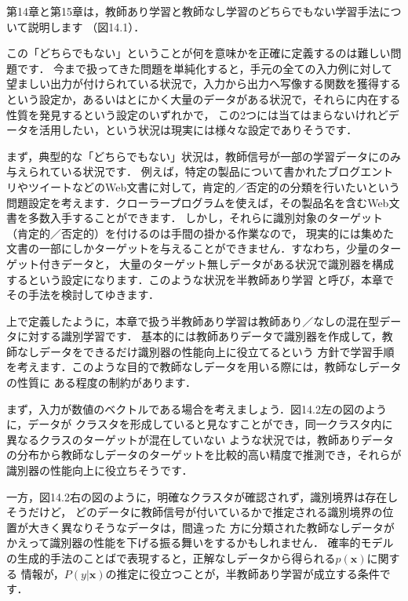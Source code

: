 

第14章と第15章は，教師あり学習と教師なし学習のどちらでもない学習手法について説明します
（図14.1）．


この「どちらでもない」ということが何を意味かを正確に定義するのは難しい問題です．
今まで扱ってきた問題を単純化すると，手元の全ての入力例に対して望ましい出力が付けられている状況で，入力から出力へ写像する関数を獲得するという設定か，あるいはとにかく大量のデータがある状況で，それらに内在する性質を発見するという設定のいずれかで，
この2つには当てはまらないけれどデータを活用したい，という状況は現実には様々な設定でありそうです．

まず，典型的な「どちらでもない」状況は，教師信号が一部の学習データにのみ与えられている状況です．
例えば，特定の製品について書かれたブログエントリやツイートなどのWeb文書に対して，肯定的／否定的の分類を行いたいという
問題設定を考えます．クローラープログラムを使えば，その製品名を含むWeb文書を多数入手することができます．
しかし，それらに識別対象のターゲット（肯定的／否定的）を付けるのは手間の掛かる作業なので，
現実的には集めた文書の一部にしかターゲットを与えることができません．すなわち，少量のターゲット付きデータと，
大量のターゲット無しデータがある状況で識別器を構成するという設定になります．このような状況を半教師あり学習
と呼び，本章でその手法を検討してゆきます．



上で定義したように，本章で扱う半教師あり学習は教師あり／なしの混在型データに対する識別学習です．
基本的には教師ありデータで識別器を作成して，教師なしデータをできるだけ識別器の性能向上に役立てるという
方針で学習手順を考えます．このような目的で教師なしデータを用いる際には，教師なしデータの性質に
ある程度の制約があります．



まず，入力が数値のベクトルである場合を考えましょう．図14.2左の図のように，データが
クラスタを形成していると見なすことができ，同一クラスタ内に異なるクラスのターゲットが混在していない
ような状況では，教師ありデータの分布から教師なしデータのターゲットを比較的高い精度で推測でき，それらが
識別器の性能向上に役立ちそうです．


一方，図14.2右の図のように，明確なクラスタが確認されず，識別境界は存在しそうだけど，
どのデータに教師信号が付いているかで推定される識別境界の位置が大きく異なりそうなデータは，間違った
方に分類された教師なしデータがかえって識別器の性能を下げる振る舞いをするかもしれません．
確率的モデルの生成的手法のことばで表現すると，正解なしデータから得られる$p(\bm{x})$に関する
情報が，$P(y|\bm{x})$の推定に役立つことが，半教師あり学習が成立する条件です．


